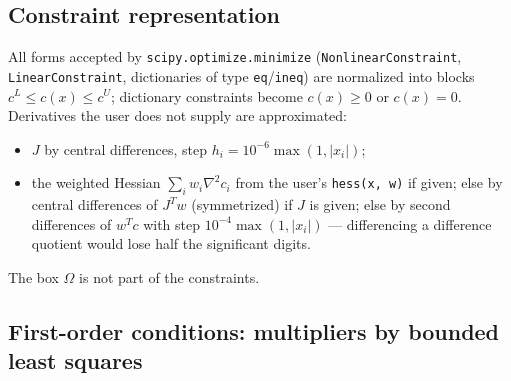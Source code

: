 \documentclass[11pt]{article}
\newcommand{\code}[1]{\texttt{#1}}
\begin{document}
\subsection{Constraint representation}

All forms accepted by \code{scipy.optimize.minimize} (\code{NonlinearConstraint},
\code{LinearConstraint}, dictionaries of type \code{eq}/\code{ineq}) are normalized into blocks
$c^L \le c(x) \le c^U$; dictionary constraints become $c(x) \ge 0$ or $c(x) = 0$. Derivatives
the user does not supply are approximated:
\begin{itemize}
  \item $J$ by central differences, step $h_i = 10^{-6}\max(1, |x_i|)$;
  \item the weighted Hessian $\sum_i w_i \nabla^2 c_i$ from the user's \code{hess(x, w)} if
  given; else by central differences of $J^T w$ (symmetrized) if $J$ is given; else by second
  differences of $w^T c$ with step $10^{-4}\max(1,|x_i|)$ --- differencing a difference quotient
  would lose half the significant digits.
\end{itemize}
The box $\Omega$ is not part of the constraints.

\subsection{First-order conditions: multipliers by bounded least squares}
\end{document}
